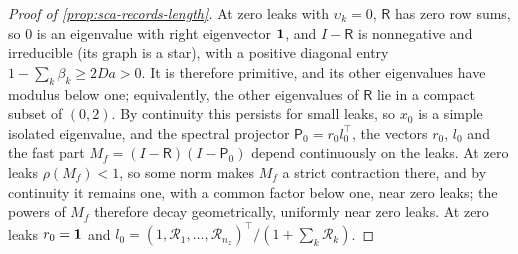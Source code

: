 \begin{proof}[Proof of \cref{prop:sca-records-length}]
At zero leaks with $\upsilon_k=0$, $\mathsf R$ has zero row sums, so $0$ is an eigenvalue with right eigenvector $\mathbf{1}$, and $I-\mathsf R$ is nonnegative and irreducible (its graph is a star), with a positive diagonal entry $1-\sum_k\beta_k\ge2Da>0$. It is therefore primitive, and its other eigenvalues have modulus below one; equivalently, the other eigenvalues of $\mathsf R$ lie in a compact subset of $(0,2)$. By continuity this persists for small leaks, so $x_0$ is a simple isolated eigenvalue, and the spectral projector $\mathsf P_0=r_0l_0^\top$, the vectors $r_0$, $l_0$ and the fast part $M_f=(I-\mathsf R)(I-\mathsf P_0)$ depend continuously on the leaks. At zero leaks $\rho(M_f)<1$, so some norm makes $M_f$ a strict contraction there, and by continuity it remains one, with a common factor below one, near zero leaks; the powers of $M_f$ therefore decay geometrically, uniformly near zero leaks. At zero leaks $r_0=\mathbf{1}$ and $l_0=(1,\mathcal R_1,\dots,\mathcal R_{n_z})^\top/(1+\sum_k\mathcal R_k)$.


\end{proof}
